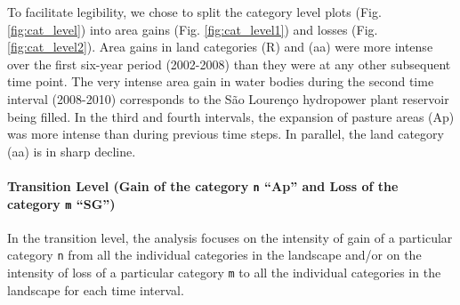 To facilitate legibility, we chose to split the category level plots
(Fig. \ref{fig:cat_level}) into area gains (Fig. \ref{fig:cat_level1})
and losses (Fig. \ref{fig:cat_level2}). Area gains in land categories (R)
and (aa) were more intense over the first six-year period (2002-2008) than
they were at any other subsequent time point. The very intense area gain
in water bodies during the second time interval (2008-2010) corresponds
to the São Lourenço hydropower plant reservoir being filled. In the
third and fourth intervals, the expansion of pasture areas (Ap) was more
intense than during previous time steps. In parallel, the land category
(aa) is in sharp decline.

\hypertarget{transition-level-gain-of-the-category-n-ap-and-loss-of-the-category-m-sg}{%
\paragraph{\texorpdfstring{Transition Level (Gain of the category
\texttt{n} ``Ap'' and Loss of the category \texttt{m}
``SG'')}{Transition Level (Gain of the category n ``Ap'' and Loss of the category m ``SG'')}}\label{transition-level-gain-of-the-category-n-ap-and-loss-of-the-category-m-sg}}

In the transition level, the analysis focuses on the intensity of gain
of a particular category \texttt{n} from all the individual categories
in the landscape and/or on the intensity of loss of a particular
category \texttt{m} to all the individual categories in the landscape
for each time interval.

